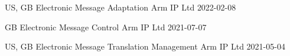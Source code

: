 \nopagebreak
\begin{cvawards}

\cvaward
  {US, GB} %
  {Electronic Message Adaptation}
  {Arm IP Ltd}
  {2022-02-08}

\cvaward
  {GB} %
  {Electronic Message Control}
  {Arm IP Ltd}
  {2021-07-07}

\cvaward
  {US, GB}
  {Electronic Message Translation Management}
  {Arm IP Ltd}
  {2021-05-04}

\end{cvawards}
